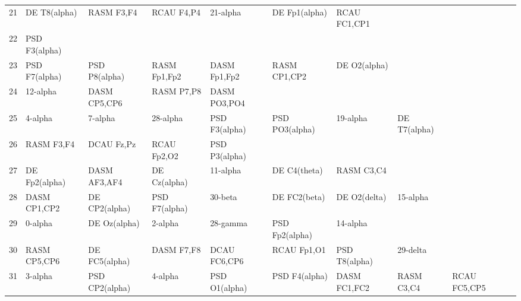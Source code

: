 \begin{landscape}
\begin{table}[]
\begin{tabular}{l|llllllll}
21       & DE T8(alpha)   & RASM F3,F4     & RCAU F4,P4     & 21-alpha       & DE Fp1(alpha)  & RCAU FC1,CP1   &               &                &               &               \\
22       & PSD F3(alpha)  &                &                &                &                &                &               &                &               &               \\
23       & PSD F7(alpha)  & PSD P8(alpha)  & RASM Fp1,Fp2   & DASM Fp1,Fp2   & RASM CP1,CP2   & DE O2(alpha)   &               &                &               &               \\
24       & 12-alpha       & DASM CP5,CP6   & RASM P7,P8     & DASM PO3,PO4   &                &                &               &                &               &               \\
25       & 4-alpha        & 7-alpha        & 28-alpha       & PSD F3(alpha)  & PSD PO3(alpha) & 19-alpha       & DE T7(alpha)  &                &               &               \\
26       & RASM F3,F4     & DCAU Fz,Pz     & RCAU Fp2,O2    & PSD P3(alpha)  &                &                &               &                &               &               \\
27       & DE Fp2(alpha)  & DASM AF3,AF4   & DE Cz(alpha)   & 11-alpha       & DE C4(theta)   & RASM C3,C4     &               &                &               &               \\
28       & DASM CP1,CP2   & DE CP2(alpha)  & PSD F7(alpha)  & 30-beta        & DE FC2(beta)   & DE O2(delta)   & 15-alpha      &                &               &               \\
29       & 0-alpha        & DE Oz(alpha)   & 2-alpha        & 28-gamma       & PSD Fp2(alpha) & 14-alpha       &               &                &               &               \\
30       & RASM CP5,CP6   & DE FC5(alpha)  & DASM F7,F8     & DCAU FC6,CP6   & RCAU Fp1,O1    & PSD T8(alpha)  & 29-delta      &                &               &               \\
31       & 3-alpha        & PSD CP2(alpha) & 4-alpha        & PSD O1(alpha)  & PSD F4(alpha)  & DASM FC1,FC2   & RASM C3,C4    & RCAU FC5,CP5   &               &               \\
\end{tabular}
\end{table}
\end{landscape}
\clearpage
